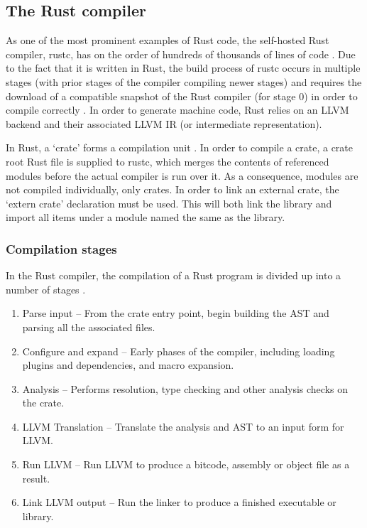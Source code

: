 \subsection{The Rust compiler}
As one of the most prominent examples of Rust code, the self-hosted Rust compiler, rustc, has on the order of hundreds of thousands of lines of code \cite{openhub15}. Due to the fact that it is written in Rust, the build process of rustc occurs in multiple stages (with prior stages of the compiler compiling newer stages) and requires the download of a compatible snapshot of the Rust compiler (for stage 0) in order to compile correctly \cite{makefile15}. In order to generate machine code, Rust relies on an LLVM backend and their associated LLVM IR (or intermediate representation).

In Rust, a `crate' forms a compilation unit \cite{examplecrates15}. In order to compile a crate, a crate root Rust file is supplied to rustc, which merges the contents of referenced modules before the actual compiler is run over it. As a consequence, modules are not compiled individually, only crates. In order to link an external crate, the `extern crate' declaration must be used. This will both link the library and import all items under a module named the same as the library. 

\subsubsection{Compilation stages}
In the Rust compiler, the compilation of a Rust program is divided up into a number of stages \cite{driver15}. 

\begin{enumerate}
\item Parse input -- From the crate entry point, begin building the AST and parsing all the associated files.
\item Configure and expand -- Early phases of the compiler, including loading plugins and dependencies, and macro expansion.
\item Analysis -- Performs resolution, type checking and other analysis checks on the crate.
\item LLVM Translation -- Translate the analysis and AST to an input form for LLVM.
\item Run LLVM -- Run LLVM to produce a bitcode, assembly or object file as a result.
\item Link LLVM output -- Run the linker to produce a finished executable or library.
\end{enumerate}

